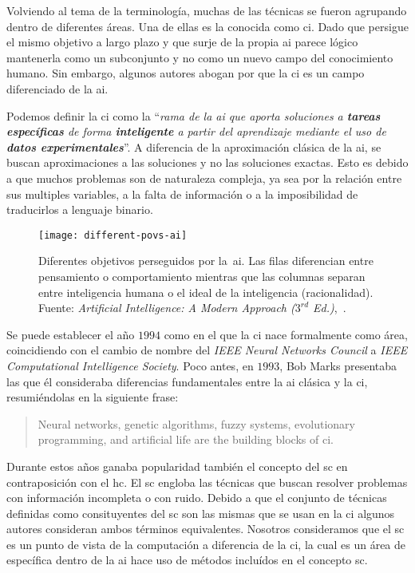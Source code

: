 Volviendo al tema de la terminología, muchas de las técnicas se fueron agrupando dentro de diferentes áreas. Una de ellas es la conocida como \acrlong{ci}. Dado que persigue el mismo objetivo a largo plazo y que surje de la propia \gls{ai} parece lógico mantenerla como un subconjunto y no como un nuevo campo del conocimiento humano. Sin embargo, algunos autores abogan por que la \gls{ci} es un campo diferenciado de la \gls{ai}.

Podemos definir la \acrlong{ci} como la \enquote{\textit{rama de la \gls{ai} que aporta soluciones a \textbf{tareas específicas} de forma \textbf{inteligente} a partir del aprendizaje mediante el uso de \textbf{datos experimentales}}}. A diferencia de la aproximación clásica de la \gls{ai}, se buscan aproximaciones a las soluciones y no las soluciones exactas. Esto es debido a que muchos problemas son de naturaleza compleja, ya sea por la relación entre sus multiples variables, a la falta de información o a la imposibilidad de traducirlos a lenguaje binario.

\begin{figure}
	\texttt{[image: different-povs-ai]}
	\caption[Diferentes objetivos perseguidos por la \acrlong{ai}.]{Diferentes objetivos perseguidos por la~\acrlong{ai}. Las filas diferencian entre pensamiento o comportamiento mientras que las columnas separan entre inteligencia humana o el ideal de la inteligencia (racionalidad). Fuente: \textit{Artificial Intelligence: A Modern Approach ($3^{rd}$ Ed.)},~\cite{russell2003artificial}.}
	\label{fig:different-povs-ai}
\end{figure}

Se puede establecer el año $1994$ como en el que la \acrlong{ci} nace formalmente como área, coincidiendo con el cambio de nombre del \textit{IEEE Neural Networks Council} a \textit{IEEE Computational Intelligence Society}. Poco antes, en $1993$, Bob Marks presentaba las que él consideraba diferencias fundamentales entre la \acrlong{ai} clásica y la \acrlong{ci}, resumiéndolas en la siguiente frase:

\blockquote{Neural networks, genetic algorithms, fuzzy systems, evolutionary programming, and artificial life are the building blocks of \ac{ci}.}

Durante estos años ganaba popularidad también el concepto del \gls{sc} en contraposición con el \gls{hc}. El \gls{sc} engloba las técnicas que buscan resolver problemas con información incompleta o con ruido. Debido a que el conjunto de técnicas definidas como consituyentes del \gls{sc} son las mismas que se usan en la \gls{ci} algunos autores consideran ambos términos equivalentes. Nosotros consideramos que el \gls{sc} es un punto de vista de la computación a diferencia de la \gls{ci}, la cual es un área de específica dentro de la \gls{ai} hace uso de métodos incluídos en el concepto \gls{sc}.

